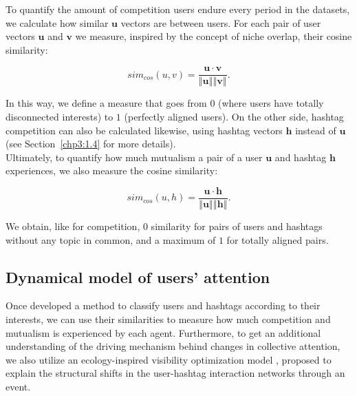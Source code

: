 To quantify the amount of competition users endure every period in the datasets, we calculate how similar $\mathbf{u}$ vectors are between users. For each pair of user vectors $\mathbf{u}$ and $\mathbf{v}$ we measure, inspired by the concept of niche overlap, their cosine  similarity: 

\begin{equation}
    sim_{cos}(u,v) = \frac{\mathbf{u} \cdot \mathbf{v}}{\left\Vert \mathbf{u} \right\Vert  \left\Vert  \mathbf{v} \right\Vert}.
\label{eqsim}
\end{equation}

In this way, we define a measure that goes from $0$ (where users have totally disconnected interests) to $1$ (perfectly aligned users). On the other side, hashtag competition can also be calculated likewise, using hashtag vectors $\mathbf{h}$ instead of $\mathbf{u}$ (see Section~\ref{chp3:1.4} for more details).  \\

Ultimately, to quantify how much mutualism a pair of a user $\mathbf{u}$ and hashtag $\mathbf{h}$ experiences, we also measure the cosine similarity:

\begin{equation}
    sim_{cos}(u,h) = \frac{\mathbf{u} \cdot \mathbf{h}}{\left\Vert \mathbf{u} \right\Vert  \left\Vert  \mathbf{h} \right\Vert}.
\end{equation}

We obtain, like for competition, $0$ similarity for pairs of users and hashtags without any topic in common, and a maximum of $1$ for totally aligned pairs.

\subsection{Dynamical model of users' attention}
\label{chp3:1.3}
Once developed a method to classify users and hashtags according to their interests, we can  use their similarities to measure how much competition and mutualism is experienced by each agent. Furthermore, to get an additional understanding of the driving mechanism behind changes in collective attention, we also utilize an ecology-inspired visibility optimization model \cite{palazzi2021ecological}, proposed to explain the structural shifts in the user-hashtag interaction networks through an event. \\

